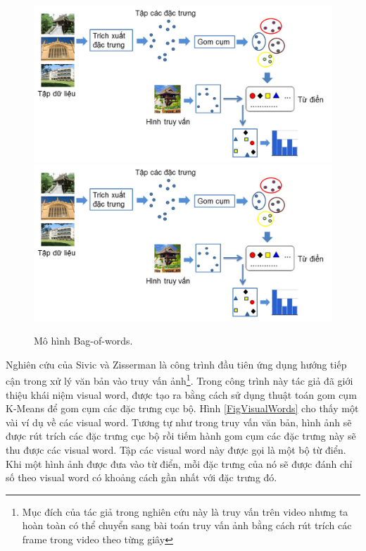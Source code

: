 \begin{figure}[!htbp]
  \begin{center}
    \leavevmode
    \ifpdf
      \includegraphics[scale=0.38]{bow}
    \else
      \includegraphics[scale=0.38]{bow}
    \fi
    \caption[Mô hình Bag-of-words]{Mô hình Bag-of-words.}
    \label{FigBoW}
  \end{center}
\end{figure}

Nghiên cứu của Sivic và Zisserman \cite{sivic2003video} là công trình đầu tiên ứng dụng hướng tiếp cận trong xử lý văn bản vào truy vấn ảnh\footnote{Mục đích của tác giả trong nghiên cứu này là truy vấn trên video nhưng ta hoàn toàn có thể chuyển sang bài toán truy vấn ảnh bằng cách rút trích các frame trong video theo từng giây}. Trong công trình này tác giả đã giới thiệu khái niệm visual word, được tạo ra bằng cách sử dụng thuật toán gom cụm K-Means để gom cụm các đặc trưng cục bộ. Hình \ref{FigVisualWords} cho thấy một vài ví dụ về các visual word. Tương tự như trong truy vấn văn bản, hình ảnh sẽ được rút trích các đặc trưng cục bộ rồi tiếm hành gom cụm các đặc trưng này sẽ thu được các visual word. Tập các visual word này được gọi là một bộ từ điển. Khi một hình ảnh được đưa vào từ điển, mỗi đặc trưng của nó sẽ được đánh chỉ số theo visual word có khoảng cách gần nhất với đặc trưng đó.

